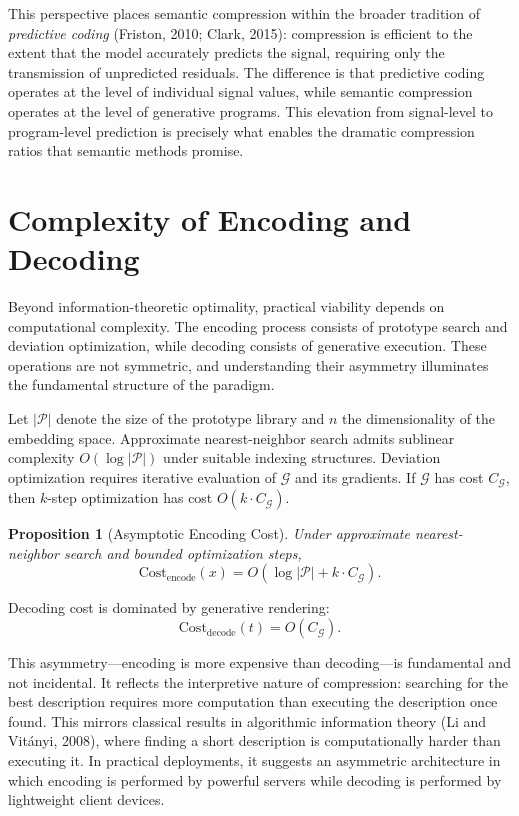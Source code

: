 \documentclass[11pt,a4paper]{article}
\newtheorem{proposition}[theorem]{Proposition}
\theoremstyle{definition}
\theoremstyle{remark}
\begin{document}
This perspective places semantic compression within the broader tradition of \emph{predictive coding} (Friston, 2010; Clark, 2015): compression is efficient to the extent that the model accurately predicts the signal, requiring only the transmission of unpredicted residuals. The difference is that predictive coding operates at the level of individual signal values, while semantic compression operates at the level of generative programs. This elevation from signal-level to program-level prediction is precisely what enables the dramatic compression ratios that semantic methods promise.

\section{Complexity of Encoding and Decoding}
\label{sec:complexity}

Beyond information-theoretic optimality, practical viability depends on computational complexity. The encoding process consists of prototype search and deviation optimization, while decoding consists of generative execution. These operations are not symmetric, and understanding their asymmetry illuminates the fundamental structure of the paradigm.

Let $|\mathcal{P}|$ denote the size of the prototype library and $n$ the dimensionality of the embedding space. Approximate nearest-neighbor search admits sublinear complexity $O(\log |\mathcal{P}|)$ under suitable indexing structures. Deviation optimization requires iterative evaluation of $\mathcal{G}$ and its gradients. If $\mathcal{G}$ has cost $C_{\mathcal{G}}$, then $k$-step optimization has cost $O(k \cdot C_{\mathcal{G}})$.

\begin{proposition}[Asymptotic Encoding Cost]
Under approximate nearest-neighbor search and bounded optimization steps,
\[
\mathrm{Cost}_{\mathrm{encode}}(x) = O(\log |\mathcal{P}| + k \cdot C_{\mathcal{G}}).
\]
\end{proposition}

Decoding cost is dominated by generative rendering:
\[
\mathrm{Cost}_{\mathrm{decode}}(t) = O(C_{\mathcal{G}}).
\]

This asymmetry---encoding is more expensive than decoding---is fundamental and not incidental. It reflects the interpretive nature of compression: searching for the best description requires more computation than executing the description once found. This mirrors classical results in algorithmic information theory (Li and Vit\'{a}nyi, 2008), where finding a short description is computationally harder than executing it. In practical deployments, it suggests an asymmetric architecture in which encoding is performed by powerful servers while decoding is performed by lightweight client devices.
\end{document}
